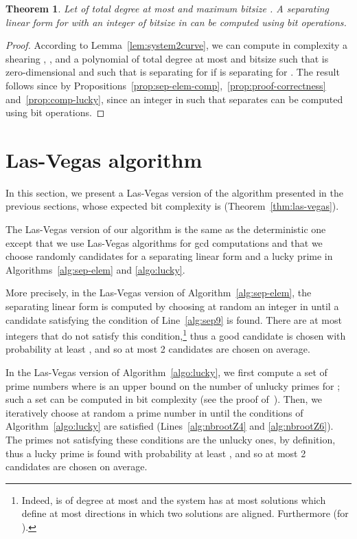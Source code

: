\documentclass{sig-alternate}
\newtheorem{theorem}{Theorem}
\newcommand{\blue}[1]{\color{blue}#1\color{black}\xspace}
\renewcommand{\blue}[1]{#1\xspace}
\begin{document}
\begin{theorem}\label{thm:final}
Let  of total degree at most  and maximum bitsize . A separating linear form  for  with  an integer of bitsize in \blue{}  can be computed using  bit operations.
\end{theorem}


\begin{proof}
According to Lemma~\ref{lem:system2curve}, we can compute in complexity  a
\blue{shearing} , , and a polynomial  of total degree at most
 and bitsize   such that  is
zero-dimensional and such that  is separating for
 if  is separating for . The result follows since by
Propositions~\ref{prop:sep-elem-comp},~\ref{prop:proof-correctness}
and~\ref{prop:comp-lucky}, since an
 integer  in  such that  separates  can be computed using   bit operations.
\end{proof}


\section{\blue{Las-Vegas algorithm}} \label{sec:Las-Vegas}



\blue{In this section, we present a Las-Vegas version of the algorithm presented in the
previous sections, whose expected bit complexity is  
(Theorem~\ref{thm:las-vegas}).}



The Las-Vegas version of our algorithm is the same as the deterministic one except that we use
Las-Vegas algorithms for gcd computations and that we choose randomly candidates for a separating linear
form and a lucky prime
 in Algorithms~\ref{alg:sep-elem} and \ref{algo:lucky}.


 More precisely, \blue{in the Las-Vegas version of}
 Algorithm~\ref{alg:sep-elem}, the separating linear form is computed by
 choosing at random an integer  in  until a candidate satisfying the
 condition of Line~\ref{alg:sep9} is found. There are at most  integers
 that do not satisfy this condition,\footnote{\small Indeed,  is of
   degree at most  and the system  has at most 
   solutions which define at most  directions in which two
   solutions are aligned. Furthermore  (for ).}  thus a good candidate is chosen with probability at least ,
 and so at most 2 candidates are chosen on average.

\blue{In the Las-Vegas version of} Algorithm~\ref{algo:lucky}, we  first compute a set  of  prime numbers where  is an
upper bound on the number of unlucky primes for ; such 
a set  can be computed in bit complexity  (see the proof of~\blue{\cite[Lemma 18]{bouzidiJSC2014a}}).  Then, we iteratively choose at random a prime number  in  until the conditions of
Algorithm~\ref{algo:lucky} are satisfied (Lines~\ref{alg:nbrootZ4} and \ref{alg:nbrootZ6}). 
The primes not satisfying these conditions are the unlucky ones, by definition, thus a lucky prime
is found with probability at least , and so at most 2 candidates are
chosen on average. 
\end{document}

